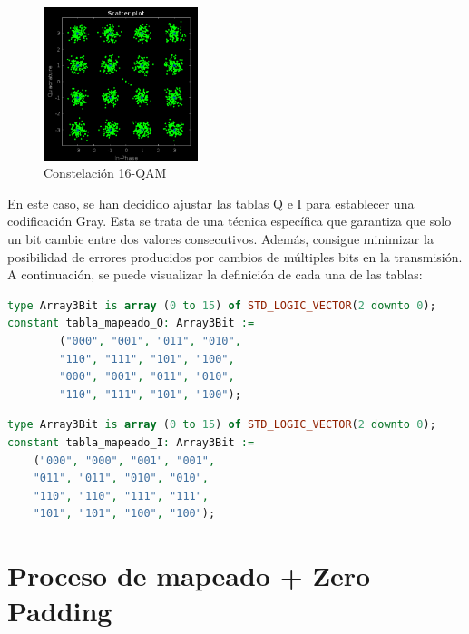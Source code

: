 \vspace{3mm}

\begin{figure}[h]
	\centering
	\includegraphics[width=0.4\textwidth]{img/matlab/qam.PNG}
	\caption{Constelación 16-QAM}
	\label{fig:qam}
\end{figure}

\vspace{3mm}
   
En este caso, se han decidido ajustar las tablas Q e I para establecer una codificación Gray. Esta se trata de una técnica específica que garantiza que solo un bit cambie entre dos valores consecutivos. Además, consigue minimizar la posibilidad de errores producidos por cambios de múltiples bits en la transmisión. A continuación, se puede visualizar la definición de cada una de las tablas:

\vspace{4mm}

\begin{lstlisting}[language=VHDL, style=mystyle, caption={Definición de la tabla de mapeado Q}]
type Array3Bit is array (0 to 15) of STD_LOGIC_VECTOR(2 downto 0);
constant tabla_mapeado_Q: Array3Bit :=
		("000", "001", "011", "010", 
		"110", "111", "101", "100",
		"000", "001", "011", "010", 
		"110", "111", "101", "100");
\end{lstlisting}

\vspace{5mm}

\begin{lstlisting}[language=VHDL, style=mystyle, caption={Definición de la tabla de mapeado I}]
type Array3Bit is array (0 to 15) of STD_LOGIC_VECTOR(2 downto 0);
constant tabla_mapeado_I: Array3Bit := 
	("000", "000", "001", "001", 
	"011", "011", "010", "010",
	"110", "110", "111", "111", 
	"101", "101", "100", "100");
\end{lstlisting}

\pagebreak

\section{Proceso de mapeado + Zero Padding}

